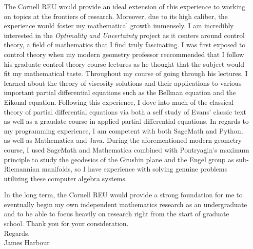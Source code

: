\documentclass[11pt]{article}
\begin{document}
The Cornell REU would provide an ideal extension of this experience to working on topics at the frontiers of research. Moreover, due to its high caliber, the experience would foster my mathematical growth immensely. I am incredibly interested in the \emph{Optimality and Uncertainty} project as it centers around control theory, a field of mathematics that I find truly fascinating. I was first exposed to control theory when my modern geometry professor reccommended that I follow his graduate control theory course lectures as he thought that the subject would fit my mathematical taste. Throughout my course of going through his lectures, I learned about the theory of viscosity solutions and their applications to various important partial differential equations such as the Bellman equation and the Eikonal equation. Following this experience, I dove into much of the classical theory of partial differential equations via both a self study of Evans' classic text as well as a graudate course in applied partial differential equations. In regards to my programming experience, I am competent with both SageMath and Python, as well as Mathematica and Java. During the aforementioned modern geometry course, I used SageMath and Mathematica combined with Pontryagin's maximum principle to study the geodesics of the Grushin plane and the Engel group as sub-Riemannian manifolds, so I have experience with solving genuine problems utilizing these computer algebra systems.

%

In the long term, the Cornell REU would provide a strong foundation for me to eventually begin my own independent mathematics research as an undergraduate and to be able to focus heavily on research right from the start of graduate school. Thank you for your consideration. \\

\noindent Regards, \\

\noindent James Harbour
\end{document}
